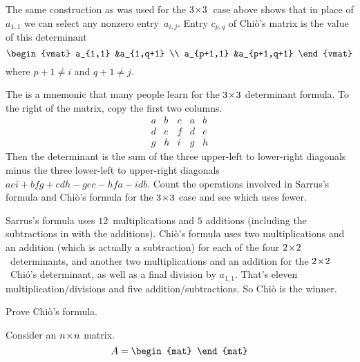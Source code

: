\begin{exercises}
    \begin{answer}
      The same construction as was used for the $3 \! \times \! 3$~case above shows
      that in place of $a_{1,1}$ we can select any nonzero entry~$a_{i,j}$.
      Entry $c_{p,q}$ of Chi\`o's matrix is the value of this determinant
      \begin{equation*}
        \begin{vmat}
          a_{1,1}    &a_{1,q+1} \\
          a_{p+1,1}  &a_{p+1,q+1}
        \end{vmat}
      \end{equation*}
      where $p+1\neq i$ and $q+1\neq j$.
    \end{answer}
  \item The 
    is a mnemonic that many people learn 
    for the $3 \! \times \! 3$ determinant formula.
    To the right of the matrix, copy the first two columns. 
    \begin{equation*}
      \begin{array}{ccc|cc}
        a &b &c &a &b \\
        d &e &f &d &e \\
        g &h &i &g &h
      \end{array}
    \end{equation*}
    Then the determinant is the sum of the
    three upper-left to lower-right diagonals minus the
    three lower-left to upper-right diagonals
    $aei+bfg+cdh-gec-hfa-idb$.
   Count the operations involved in Sarrus's formula and 
   Chi\`o's formula for the $3 \! \times \! 3$ case and see which uses fewer.
   \begin{answer}
     Sarrus's formula uses $12$~multiplications and $5$ additions (including
     the subtractions in with the additions).
     Chi\`o's formula uses two multiplications and an addition
     (which is actually a subtraction)
     for each of the four $2 \! \times \! 2$~determinants, and another two
     multiplications and an addition for the $2 \! \times \! 2$~Chi\'o's determinant, as
     well as a final division by $a_{1,1}$.
     That's eleven multiplication/divisions and five addition/subtractions.
     So Chi\`o is the winner.
   \end{answer}
  \item Prove Chi\`o's formula.
    \begin{answer}
      Consider an $n \! \times \! n$ matrix.
      \begin{equation*}
        A=
        \begin{mat}

\end{mat}
\end{equation*}
\end{answer}
\end{exercises}
